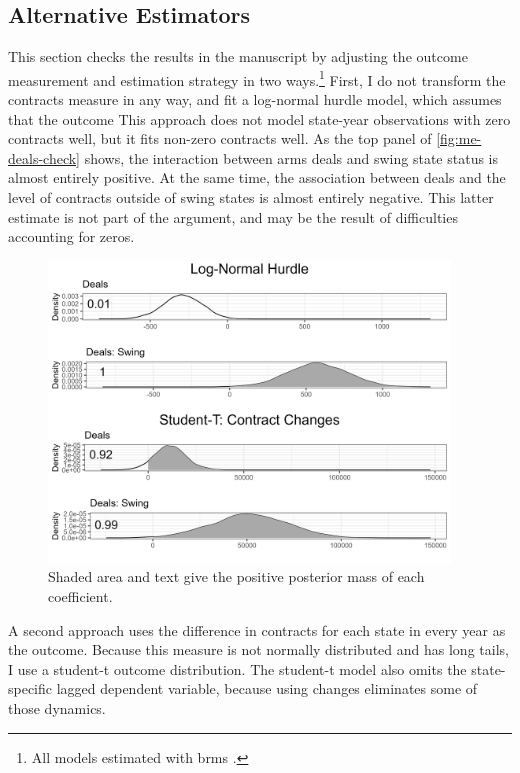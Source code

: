 \documentclass[12pt]{article}
\begin{document}
\subsection{Alternative Estimators}

This section checks the results in the manuscript by adjusting the outcome measurement and estimation strategy in two ways.\footnote{All models estimated with brms \citep{Buerkner2017}.} 
First, I do not transform the contracts measure in any way, and fit a log-normal hurdle model, which assumes that the outcome 
This approach does not model state-year observations with zero contracts well, but it fits non-zero contracts well. 
As the top panel of \autoref{fig:me-deals-check} shows, the interaction between arms deals and swing state status is almost entirely positive.
At the same time, the association between deals and the level of contracts outside of swing states is almost entirely negative. 
This latter estimate is not part of the argument, and may be the result of difficulties accounting for zeros. 
 

\begin{figure}[htpb]
	\centering
		\includegraphics[width=0.95\textwidth]{me-deals-check.png}
	\caption{Shaded area and text give the positive posterior mass of each coefficient.}
	\label{fig:me-deals-check}
\end{figure}


A second approach uses the difference in contracts for each state in every year as the outcome. 
Because this measure is not normally distributed and has long tails, I use a student-t outcome distribution.
The student-t model also omits the state-specific lagged dependent variable, because using changes eliminates some of those dynamics. 
\end{document}
